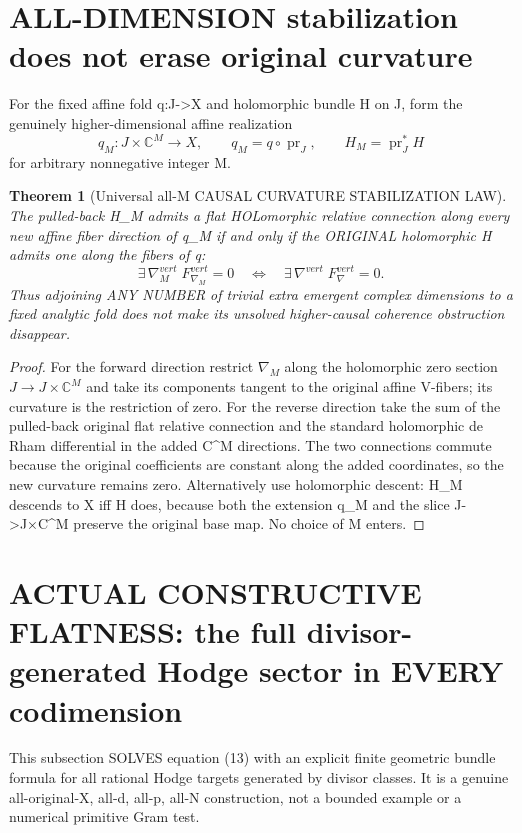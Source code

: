 \documentclass[11pt]{article}
\newtheorem{theorem}{Theorem}
\begin{document}
\section{ALL-DIMENSION stabilization does not erase original curvature}
For the fixed affine fold q:J->X
and holomorphic bundle H on J,
form the genuinely higher-dimensional
affine realization
\[
 q_M:J\times\mathbb C^M\to X,
 \qquad q_M=q\circ\operatorname{pr}_J,
 \qquad H_M=\operatorname{pr}_J^*H
 \tag{17}
\]
for arbitrary nonnegative integer M.

\begin{theorem}[Universal all-M CAUSAL CURVATURE STABILIZATION LAW]
The pulled-back H_M admits a
flat HOLomorphic relative connection
along every new affine fiber direction
of q_M if and only if the ORIGINAL
holomorphic H admits one along
the fibers of q:
\[
 \boxed{
  \exists\,\nabla_M^{vert}
     \;F_{\nabla_M}^{vert}=0
 \quad\Longleftrightarrow\quad
  \exists\,\nabla^{vert}
     \;F_{\nabla}^{vert}=0.
 }                                                       \tag{18}
\]
Thus adjoining ANY NUMBER of trivial
extra emergent complex dimensions to
a fixed analytic fold does not
make its unsolved higher-causal
coherence obstruction disappear.
\end{theorem}
\begin{proof}
For the forward direction restrict
$\nabla_M$ along the holomorphic
zero section $J\to J\times\mathbb C^M$
and take its components tangent to
the original affine V-fibers; its
curvature is the restriction of zero.
For the reverse direction take the
sum of the pulled-back original
flat relative connection and the
standard holomorphic de Rham
differential in the added C^M
directions. The two connections
commute because the original
coefficients are constant along
the added coordinates, so the
new curvature remains zero.
Alternatively use holomorphic
descent: H_M descends to X iff
H does, because both the
extension q_M and the slice
J->J×C^M preserve the original
base map. No choice of M enters.
\end{proof}

\section{ACTUAL CONSTRUCTIVE FLATNESS: the full divisor-generated Hodge sector in EVERY codimension}

This subsection SOLVES equation (13) with an
explicit finite geometric bundle formula
for all rational Hodge targets generated
by divisor classes. It is a genuine
all-original-X, all-d, all-p, all-N
construction, not a bounded example or
a numerical primitive Gram test.
\end{document}
